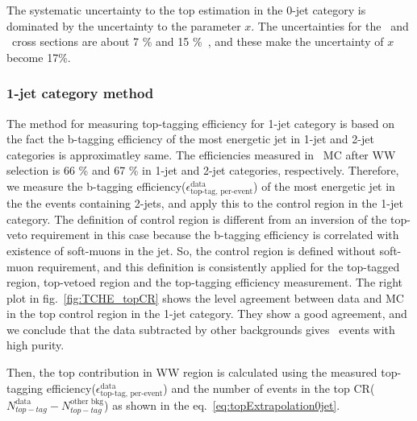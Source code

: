 The systematic uncertainty to the top estimation in the 0-jet category 
is dominated by the uncertainty to the parameter $x$. The uncertainties
for the \ttbar\ and \tw\ cross sections are about 7 \% and 15 \%~\cite{Kidonakis:2012rm}, 
and these make the uncertainty of $x$ become 17\%. 

\subsubsection{1-jet category method}

The method for measuring top-tagging efficiency for 1-jet category is 
based on the fact the b-tagging efficiency of the most energetic jet 
in 1-jet and 2-jet categories is approximatley same. The efficiencies 
measured in \ttbar\ MC after WW selection is 66 \% and 67 \% in 1-jet 
and 2-jet categories, respectively. Therefore, we measure the b-tagging 
efficiency($\epsilon_{\textrm{top-tag, per-event}}^{\textrm{data}}$) 
of the most energetic jet in the the events containing 2-jets,
and apply this to the control region in the 1-jet category.  
The definition of control region is different from an inversion of 
the top-veto requirement in this case because the b-tagging efficiency 
is correlated with existence of soft-muons in the jet. 
So, the control region is defined without soft-muon requirement, 
and this definition is consistently applied for the top-tagged region, 
top-vetoed region and the top-tagging efficiency measurement.
The right plot in fig.~\ref{fig:TCHE_topCR} shows the level agreement between 
data and MC in the top control region in the 1-jet category.  
They show a good agreement, and we conclude that the data subtracted by other backgrounds 
gives \topbkg\ events with high purity. 

Then, the top contribution in WW region is calculated using the measured
top-tagging efficiency($\epsilon_{\textrm{top-tag, per-event}}^{\textrm{data}}$) 
and the number of events in the top CR($N_{top-tag}^{\textrm{data}}
-N_{top-tag}^{\textrm{other bkg}}$) as shown in the eq.~\ref{eq:topExtrapolation0jet}.

